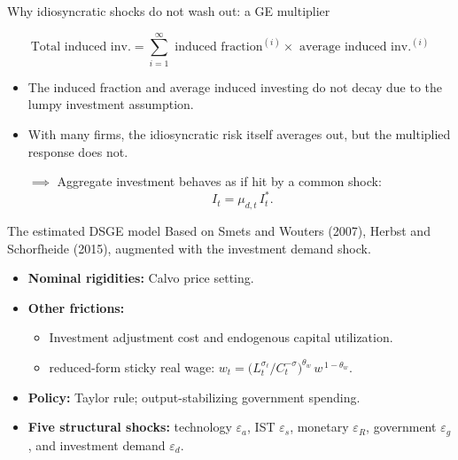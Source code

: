\documentclass[9pt]{beamer}
\begin{document}
\begin{frame}{Why idiosyncratic shocks do not wash out: a GE multiplier}
	\centering


	$$\text{Total induced inv.} = \sum_{i=1}^{\infty} \text{ induced fraction}^{(i)} \times \text{ average induced inv.}^{(i)}$$
	\begin{itemize}
		\item The induced fraction and average induced investing do not decay due to the lumpy investment assumption.
		\item With many firms, the idiosyncratic risk itself averages out, but the multiplied response does not. 
		
		$\implies$ Aggregate investment behaves as if hit by a common shock:
		\[\; I_t=\mu_{d,t}\,I_t^{*}.\]
	\end{itemize}
\end{frame}

\begin{frame}{The estimated DSGE model}
	Based on Smets and Wouters (2007), Herbst and Schorfheide (2015), augmented with the investment demand shock.
	\begin{itemize}
		\item \textbf{Nominal rigidities:} Calvo price setting.
		\item \textbf{Other frictions:} 
		\begin{itemize}
			\item Investment adjustment cost and endogenous capital utilization.
			\item reduced-form sticky real wage:
			\(
				w_t=\Big(L_t^{\sigma_\ell}\big/C_t^{-\sigma}\Big)^{\theta_w}\,w^{\,1-\theta_w}.
			\)
		\end{itemize}
		\item \textbf{Policy:} Taylor rule; output-stabilizing government spending.
		\item \textbf{Five structural shocks:} technology $\varepsilon_a$, IST $\varepsilon_s$, monetary $\varepsilon_R$, government $\varepsilon_g$, and investment demand $\varepsilon_d$.

	\end{itemize}
\end{frame}
\end{document}
